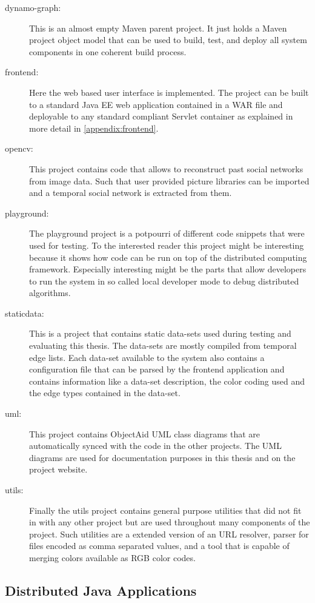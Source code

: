 \begin{description}
\item[dynamo-graph:] This is an almost empty Maven parent project. It just holds a Maven project object model that can be used to build, test, and deploy all system components in one coherent build process.
\item[frontend:] Here the web based user interface is implemented. The project can be built to a standard Java EE web application contained in a WAR file and deployable to any standard compliant Servlet container as explained in more detail in \ref{appendix:frontend}.
\item[opencv:] This project contains code that allows to reconstruct past social networks from image data. Such that user provided picture libraries can be imported and a temporal social network is extracted from them.
\item[playground:] The playground project is a potpourri of different code snippets that were used for testing. To the interested reader this project might be interesting because it shows how code can be run on top of the distributed computing framework. Especially interesting might be the parts that allow developers to run the system in so called local developer mode to debug distributed algorithms.
\item[staticdata:] This is a project that contains static data-sets used during testing and evaluating this thesis. The data-sets are mostly compiled from temporal edge lists. Each data-set available to the system also contains a configuration file that can be parsed by the frontend application and contains information like a data-set description, the color coding used and the edge types contained in the data-set.
\item[uml:] This project contains ObjectAid \versionObjectAid{} UML class diagrams that are automatically synced with the code in the other projects. The UML diagrams are used for documentation purposes in this thesis and on the project website.
\item[utils:] Finally the utils project contains general purpose utilities that did not fit in with any other project but are used throughout many components of the project. Such utilities are a extended version of an URL resolver, parser for files encoded as comma separated values, and a tool that is capable of merging colors available as RGB color codes.
\end{description}

\subsection{Distributed Java Applications}
\label{appendix:distributed}

